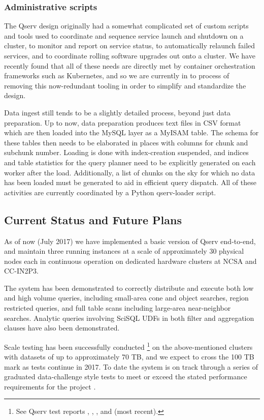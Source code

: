 \documentclass[DM,toc]{lsstdoc}
\begin{document}
\subsubsection{Administrative scripts}\label{administrative-scripts}

The Qserv design originally had a somewhat complicated set of custom scripts
and tools used to coordinate and sequence service launch and shutdown on a
cluster, to monitor and report on service status, to automatically relaunch
failed services, and to coordinate rolling software upgrades out onto a
cluster.  We have recently found that all of these needs are directly met by
container orchestration frameworks such as Kubernetes, and so we are currently
in to process of removing this now-redundant tooling in order to simplify and
standardize the design.

Data ingest still tends to be a slightly detailed process, beyond just data
preparation. Up to now, data preparation produces text files in CSV format
which are then loaded into the MySQL layer as a MyISAM table. The schema for
these tables then needs to be elaborated in places with columns for chunk and
subchunk number.  Loading is done with index-creation suspended, and indices
and table statistics for the query planner need to be explicitly generated
on each worker after the load.  Additionally, a list of chunks on the sky
for which no data has been loaded must be generated to aid in efficient
query dispatch.  All of these activities are currently coordinated by a
Python qserv-loader script.

\subsection{Current Status and Future
Plans}\label{current-status-and-future-plans}

As of now (July 2017) we have implemented a basic version of Qserv end-to-end,
and maintain three running instances at a scale of approximately 30 physical
nodes each in continuous operation on dedicated hardware clusters at NCSA and
CC-IN2P3.

The system has been demonstrated to correctly distribute and execute both low
and high volume queries, including small-area cone and object searches, region
restricted queries, and full table scans including large-area near-neighbor
searches.  Analytic queries involving SciSQL UDFs in both filter and
aggregation clauses have also been demonstrated.

Scale testing has been successfully conducted \footnote{See Qserv test reports
, , , and 
(most recent).} on the above-mentioned clusters with datasets of up to
approximately 70 TB, and we expect to cross the 100 TB mark as tests continue
in 2017.  To date the system is on track through a series of graduated data-challenge
style tests  to meet or exceed the stated
performance requirements for the project .
\end{document}

